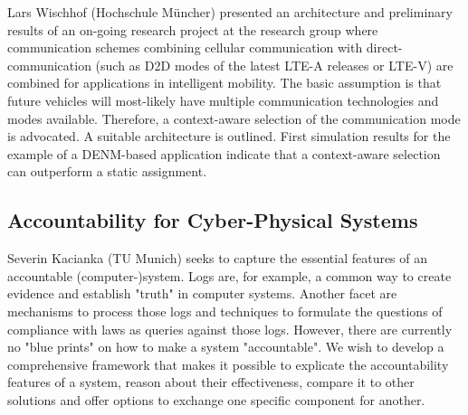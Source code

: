 Lars Wischhof (Hochschule Müncher) presented an architecture and preliminary
results of an on-going research project at the research group where
communication schemes combining cellular communication with
direct-communication (such as \ac{D2D} modes of the latest LTE-A releases or
LTE-V) are combined for applications in intelligent mobility. The basic
assumption is that future vehicles will most-likely have multiple
communication technologies and modes available. Therefore, a context-aware
selection of the communication mode is advocated. A suitable architecture is
outlined. First simulation results for the example of a DENM-based application
indicate that a context-aware selection can outperform a static assignment.


\subsection{Accountability for Cyber-Physical Systems}

Severin Kacianka (TU Munich) seeks to capture the essential features of an
accountable (computer-)system.  Logs are, for example, a common way to create
evidence and establish  "truth" in computer systems. Another facet are
mechanisms to process those logs and techniques to formulate the questions of
compliance with laws as queries against those logs.  However, there are
currently no "blue prints" on how to make a system "accountable". We wish to
develop a comprehensive framework that makes it possible to explicate the
accountability features of a system, reason about their effectiveness, compare
it to other solutions and offer options to exchange one specific component for
another.
